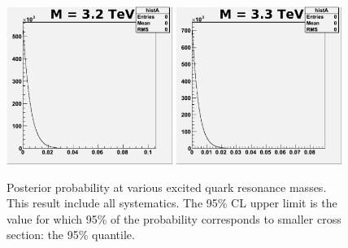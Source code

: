 \begin{figure}[!ht]
\begin{center}
     \includegraphics[width=0.48\textwidth]{Figures/MCpost3200_6_pe0.pdf}
     \includegraphics[width=0.48\textwidth]{Figures/MCpost3300_6_pe0.pdf}
 \caption{Posterior probability at
 various excited quark resonance masses.  This result include all systematics.
 The 95\% CL upper limit is the value for which 95\% of
 the probability corresponds to smaller cross section: the 95\% quantile.}
    \label{likeli4}
  \end{center}
\end{figure}

